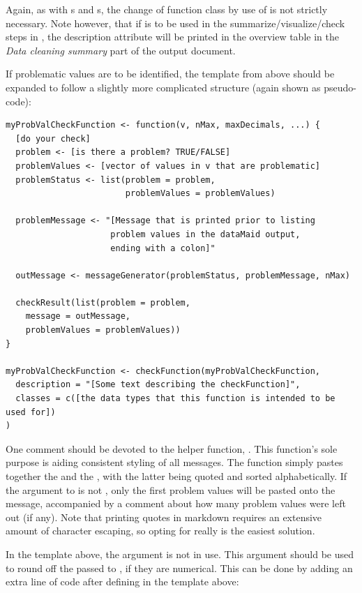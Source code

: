 \documentclass[article,shortnames]{jss}
\begin{document}
Again, as with s and s, the
change of function class by use of  is not strictly
necessary. Note however, that if  is to be
used in the summarize/visualize/check steps in , the
description attribute will be printed in the overview table in the
\textit{Data cleaning summary} part of the output document.

If problematic values are to be identified, the template from above
should be expanded to follow a slightly more complicated structure
(again shown as pseudo-code):

\begin{Verbatim}
myProbValCheckFunction <- function(v, nMax, maxDecimals, ...) {
  [do your check]
  problem <- [is there a problem? TRUE/FALSE]
  problemValues <- [vector of values in v that are problematic]
  problemStatus <- list(problem = problem,
                        problemValues = problemValues)

  problemMessage <- "[Message that is printed prior to listing
                     problem values in the dataMaid output,
                     ending with a colon]"

  outMessage <- messageGenerator(problemStatus, problemMessage, nMax)

  checkResult(list(problem = problem,
    message = outMessage,
    problemValues = problemValues))
}

myProbValCheckFunction <- checkFunction(myProbValCheckFunction,
  description = "[Some text describing the checkFunction]",
  classes = c([the data types that this function is intended to be used for])
)
\end{Verbatim}

One comment should be devoted to the helper function,
.  This function's sole purpose is aiding
consistent styling of all  messages. The function
simply pastes together the  and the
, with the latter being quoted and sorted
alphabetically. If the  argument to  is
not , only the first  problem values will be pasted
onto the message, accompanied by a comment about how many problem
values were left out (if any).  Note that printing quotes in
 markdown requires an extensive amount of character escaping, so
opting for  really is the easiest solution.

In the template above, the argument  is not in use. This
argument should be used to round off the  passed to
, if they are numerical.  This can be done by
adding an extra line of code after defining  in the template
above:
\end{document}
